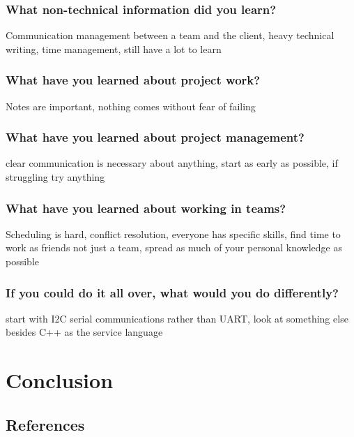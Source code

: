 \documentclass[onecolumn, draftclsnofoot,10pt, compsoc]{IEEEtran}
\begin{document}
			\subsubsection{What non-technical information did you learn?}
			Communication management between a team and the client, heavy technical writing, time management, still have a lot to learn
			\subsubsection{What have you learned about project work?}
			Notes are important, nothing comes without fear of failing
			\subsubsection{What have you learned about project management?}
			clear communication is necessary about anything, start as early as possible, if struggling try anything
			\subsubsection{What have you learned about working in teams?}
			Scheduling is hard, conflict resolution, everyone has specific skills, find time to work as friends not just a team, spread as much of your personal knowledge as possible
			\subsubsection{If you could do it all over, what would you do differently?}
			start with I2C serial communications rather than UART, look at something else besides C++ as the service language
	\section{Conclusion}


	\subsection{References}

	\begingroup
		\renewcommand{\addcontentsline}[3]{}%
		\renewcommand{\section}[2]{}%

		
		
\end{document}
